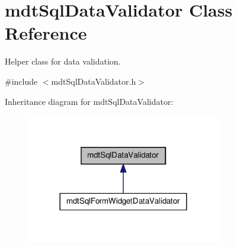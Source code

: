 \hypertarget{classmdt_sql_data_validator}{
\section{mdtSqlDataValidator Class Reference}
\label{classmdt_sql_data_validator}
}


Helper class for data validation.  




{\ttfamily \#include $<$mdtSqlDataValidator.h$>$}



Inheritance diagram for mdtSqlDataValidator:\nopagebreak
\begin{figure}[H]
\begin{center}
\leavevmode
\includegraphics[width=240pt]{classmdt_sql_data_validator__inherit__graph}
\end{center}
\end{figure}

